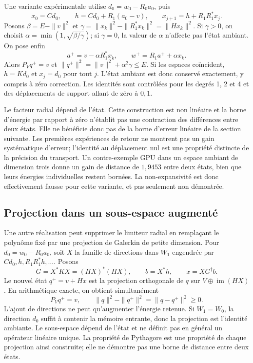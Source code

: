 \documentclass[11pt,a4paper]{article}
\begin{document}
Une variante expérimentale utilise $d_0=w_0-R_0a_0$, puis
\[
 x_0=Cd_0,\qquad h=Cd_0+R_1(a_0-v),\qquad
 x_{j+1}=h+R_1R_1^*x_j.
\]
Posons $\beta=E-\|v\|^2$ et
$\gamma=\|x_k\|^2-\|R_1^*x_k\|^2=\|Hx_k\|^2$.
Si $\gamma>0$, on choisit
$\alpha=\min(1,\sqrt{\beta/\gamma})$; si $\gamma=0$, la valeur
de $\alpha$ n'affecte pas l'état ambiant. On pose enfin
\[
 a^+=v-\alpha R_1^*x_k,\qquad w^+=R_1a^++\alpha x_k.
\]
Alors $P_Vq^+=v$ et
$\|q^+\|^2=\|v\|^2+\alpha^2\gamma\leq E$.
Si les espaces coïncident, $h=Kd_0$ et $x_j=d_0$ pour tout $j$.
L'état ambiant est donc conservé exactement, y compris à zéro correction.
Les identités sont contrôlées pour les degrés 1, 2 et 4 et des
déplacements de support allant de zéro à $0{,}1$.

Le facteur radial dépend de l'état. Cette construction est non linéaire
et la borne d'énergie par rapport à zéro n'établit pas une contraction
des différences entre deux états. Elle ne bénéficie donc pas de la
borne d'erreur linéaire de la section suivante. Les premières expériences
de retour ne montrent pas un gain systématique d'erreur; l'identité au
déplacement nul est une propriété distincte de la précision du transport.
Un contre-exemple GPU dans un espace ambiant de dimension trois donne
un gain de distance de $1{,}9453$ entre deux états, bien que leurs énergies
individuelles restent bornées. La non-expansivité est donc effectivement
fausse pour cette variante, et pas seulement non démontrée.

\subsection{Projection dans un sous-espace augmenté}
Une autre réalisation peut supprimer le limiteur radial en remplaçant
le polynôme fixé par une projection de Galerkin de petite dimension.
Pour $d_0=w_0-R_0a_0$, soit $X$ la famille de directions dans $W_1$
engendrée par $Cd_0,h,R_1R_1^*h,\ldots$.
Posons
\[
 G=X^*KX=(HX)^*(HX),\qquad b=X^*h,
 \qquad x=XG^\dagger b.
\]
Le nouvel état $q^+=v+Hx$ est la projection orthogonale de $q$ sur
$V\oplus\operatorname{im}(HX)$. En arithmétique exacte, on obtient
simultanément
\[
 P_Vq^+=v,\qquad
 \|q\|^2-\|q^+\|^2=\|q-q^+\|^2\geq0.
\]
L'ajout de directions ne peut qu'augmenter l'énergie retenue. Si
$W_1=W_0$, la direction $d_0$ suffit à contenir la mémoire entrante,
donc la projection est l'identité ambiante. Le sous-espace dépend
de l'état et ne définit pas en général un opérateur linéaire unique.
La propriété de Pythagore est une propriété de chaque projection ainsi
construite; elle ne démontre pas une borne de distance entre deux états.
\end{document}
